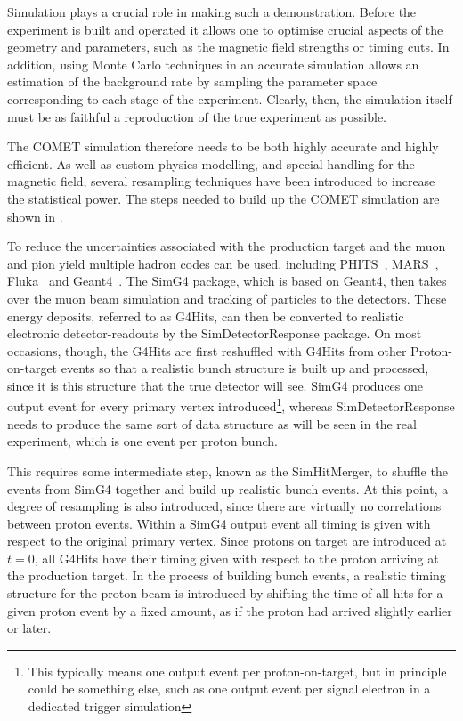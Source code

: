 Simulation plays a crucial role in making such a demonstration. 
Before the experiment is built and operated it allows one to optimise crucial aspects of the geometry and parameters, such as the magnetic field strengths or timing cuts.
In addition, using Monte Carlo techniques in an accurate simulation allows an estimation of the background rate by sampling the parameter space corresponding to each stage of the experiment.
Clearly, then, the simulation itself must be as faithful a reproduction of the true experiment as possible.
\FigSimulationOverview

The COMET simulation therefore needs to be both highly accurate and highly efficient.
As well as custom physics modelling, and special handling for the magnetic field, several resampling techniques have been introduced to increase the statistical power.
The steps needed to build up the COMET simulation are shown in .

To reduce the uncertainties associated with the production target and the muon and pion yield multiple hadron codes can be used, including PHITS~\cite{PHITS2002}, MARS~\cite{MARS1995}, Fluka~\cite{FLUKA2005} and Geant4~\cite{Geant42003}.
The SimG4 package, which is based on Geant4, then takes over the muon beam simulation and tracking of particles to the detectors.
These energy deposits, referred to as G4Hits, can then be converted to realistic electronic detector-readouts by the SimDetectorResponse package.
On most occasions, though, the G4Hits are first reshuffled with G4Hits from other Proton-on-target events so that a realistic bunch structure is built up and processed, since it is this structure that the true detector will see.
SimG4 produces one output event for every primary vertex introduced\footnote{This typically means one output event per proton-on-target, but in principle could be something else, such as one output event per signal electron in a dedicated trigger simulation}, %
whereas SimDetectorResponse needs to produce the same sort of data structure as will be seen in the real experiment, which is one event per proton bunch.

This requires some intermediate step, known as the SimHitMerger, to shuffle the events from SimG4 together and build up realistic bunch events.
At this point, a degree of resampling is also introduced, since there are virtually no correlations between proton events.
Within a SimG4 output event all timing is given with respect to the original primary vertex.  
Since protons on target are introduced at $t=0$, all G4Hits have their timing given with respect to the proton arriving at the production target.
In the process of building bunch events, a realistic timing structure for the proton beam is introduced by shifting the time of all hits for a given proton event by a fixed amount, as if the proton had arrived slightly earlier or later.

